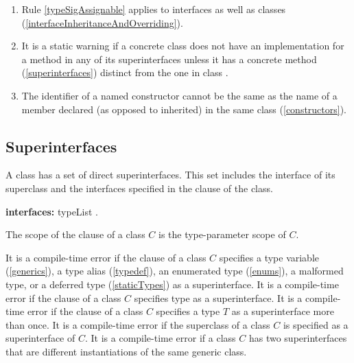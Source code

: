 \documentclass{article}
\begin{document}
{\begin{enumerate}
\begin{itemize}
\end{itemize} (\ref{interfaceInheritanceAndOverriding})
\item Rule \ref{typeSigAssignable} applies to interfaces as well as classes (\ref{interfaceInheritanceAndOverriding}).
\item It is a static warning if a concrete class does not have an implementation for a method in any of its superinterfaces unless it has a concrete  method (\ref{superinterfaces}) distinct from the one in class .
\item The identifier of a named constructor cannot be the same as the name of a member declared (as opposed to inherited) in the same class (\ref{constructors}).
\end{enumerate}
}



\subsection{Superinterfaces}

\LMHash{}
A class has a set of direct superinterfaces.
This set includes the interface of its superclass and the interfaces specified in the \IMPLEMENTS{} clause of the class.

\begin{grammar}
{\bf interfaces:}\IMPLEMENTS{} typeList
  .
\end{grammar}

\LMHash{}
The scope of the \IMPLEMENTS{} clause of a class $C$ is the type-parameter scope of $C$.

\LMHash{}
It is a compile-time error if the \IMPLEMENTS{} clause of a class $C$ specifies a type variable (\ref{generics}), a type alias (\ref{typedef}), an enumerated type (\ref{enums}), a malformed type, or a deferred type (\ref{staticTypes}) as a superinterface.
It is a compile-time error if the \IMPLEMENTS{} clause of a class $C$ specifies type \DYNAMIC{} as a superinterface.
It is a compile-time error if the \IMPLEMENTS{} clause of a class $C$ specifies a type $T$ as a superinterface more than once.
It is a compile-time error if the superclass of a class $C$ is specified as a superinterface of $C$.
It is a compile-time error if a class $C$ has two superinterfaces that are different instantiations of the same generic class. 
\end{document}
